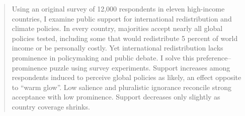\documentclass[12pt,english]{article}
\begin{document}
\begin{abstract}

Using an original survey of 12,000 respondents in eleven high-income countries, I examine public support for international redistribution and climate policies. In every country, majorities accept nearly all global policies tested, including some that would redistribute 5 percent of world income or be personally costly. Yet international redistribution lacks prominence in policymaking and public debate. I solve this preference--prominence puzzle using survey experiments. Support increases among respondents induced to perceive global policies as likely, an effect opposite to ``warm glow''. Low salience and pluralistic ignorance reconcile strong acceptance with low prominence. Support decreases only slightly as country coverage shrinks. %

\end{abstract}
\end{document}
